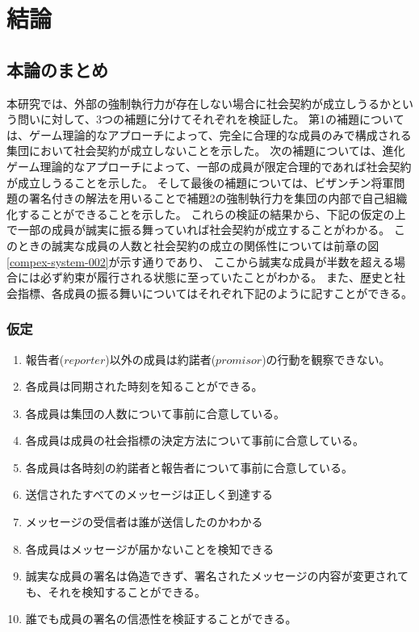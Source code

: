 \chapter{結論}
\section{本論のまとめ}
本研究では、外部の強制執行力が存在しない場合に社会契約が成立しうるかという問いに対して、3つの補題に分けてそれぞれを検証した。
第1の補題については、ゲーム理論的なアプローチによって、完全に合理的な成員のみで構成される集団において社会契約が成立しないことを示した。
次の補題については、進化ゲーム理論的なアプローチによって、一部の成員が限定合理的であれば社会契約が成立しうることを示した。
そして最後の補題については、ビザンチン将軍問題の署名付きの解法を用いることで補題2の強制執行力を集団の内部で自己組織化することができることを示した。
これらの検証の結果から、下記の仮定の上で一部の成員が誠実に振る舞っていれば社会契約が成立することがわかる。
このときの誠実な成員の人数と社会契約の成立の関係性については前章の図\ref{compex-system-002}が示す通りであり、
ここから誠実な成員が半数を超える場合には必ず約束が履行される状態に至っていたことがわかる。
また、歴史と社会指標、各成員の振る舞いについてはそれぞれ下記のように記すことができる。

\subsection{仮定}
\begin{enumerate}
  \item 報告者($reporter$)以外の成員は約諾者($promisor$)の行動を観察できない。  
  \item 各成員は同期された時刻を知ることができる。 
  \item 各成員は集団の人数について事前に合意している。
  \item 各成員は成員の社会指標の決定方法について事前に合意している。
  \item 各成員は各時刻の約諾者と報告者について事前に合意している。
  \item 送信されたすべてのメッセージは正しく到達する
  \item メッセージの受信者は誰が送信したのかわかる
  \item 各成員はメッセージが届かないことを検知できる
  \item 誠実な成員の署名は偽造できず、署名されたメッセージの内容が変更されても、それを検知することができる。
  \item 誰でも成員の署名の信憑性を検証することができる。
\end{enumerate}

